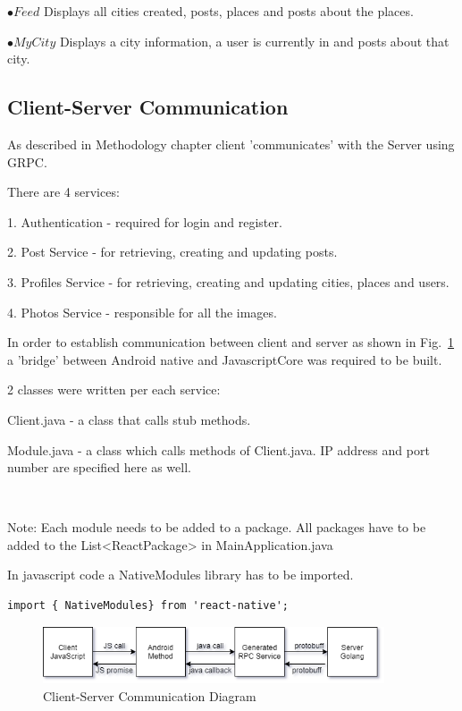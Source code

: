 $ \bullet Feed$
Displays all cities created, posts, places and posts about the places. 

$ \bullet My City$
Displays a city information, a user is currently in and posts about that city.


\subsection{Client-Server Communication}
As described in Methodology chapter client 'communicates' with the Server using GRPC.

There are 4 services: 

1. Authentication
- required for login and register.

2. Post Service
- for retrieving, creating and updating posts.

3. Profiles Service
- for retrieving, creating and updating cities, places and users.

4. Photos Service
- responsible for all the images.

In order to establish communication between client and server as shown in Fig.~\ref{fig:Client-Server Communication Diagram} a 'bridge' between Android native and JavascriptCore was required to be built.

2 classes were written per each service:

Client.java - a class that calls stub methods.

Module.java - a class which calls methods of Client.java. 
IP address and port number are specified here as well.


\

Note: Each module needs to be added to a package. All packages have to be added to the List<ReactPackage> in MainApplication.java

In javascript code a NativeModules library has to be imported.

\begin{lstlisting}
import { NativeModules} from 'react-native';
\end{lstlisting}

\begin{figure}[ht]
    \centering
    \includegraphics[width=0.9\textwidth]{img/client-server.png}
     \caption{Client-Server Communication Diagram}
    \label{fig:Client-Server Communication Diagram}
\end{figure}


